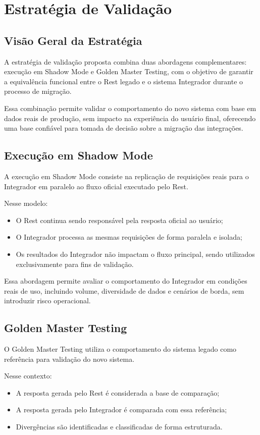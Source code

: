 \section{Estratégia de Validação}

\subsection{Visão Geral da Estratégia}
A estratégia de validação proposta combina duas abordagens complementares: execução em Shadow Mode e Golden Master Testing, com o objetivo de garantir a equivalência funcional entre o Rest legado e o sistema Integrador durante o processo de migração.

Essa combinação permite validar o comportamento do novo sistema com base em dados reais de produção, sem impacto na experiência do usuário final, oferecendo uma base confiável para tomada de decisão sobre a migração das integrações.

\subsection{Execução em Shadow Mode}
A execução em Shadow Mode consiste na replicação de requisições reais para o Integrador em paralelo ao fluxo oficial executado pelo Rest.

Nesse modelo:
\begin{itemize}
    \item O Rest continua sendo responsável pela resposta oficial ao usuário;
    \item O Integrador processa as mesmas requisições de forma paralela e isolada;
    \item Os resultados do Integrador não impactam o fluxo principal, sendo utilizados exclusivamente para fins de validação.
\end{itemize}

Essa abordagem permite avaliar o comportamento do Integrador em condições reais de uso, incluindo volume, diversidade de dados e cenários de borda, sem introduzir risco operacional.

\subsection{Golden Master Testing}

O Golden Master Testing utiliza o comportamento do sistema legado como referência para validação do novo sistema.

Nesse contexto:
\begin{itemize}
    \item A resposta gerada pelo Rest é considerada a base de comparação;
    \item A resposta gerada pelo Integrador é comparada com essa referência;
    \item Divergências são identificadas e classificadas de forma estruturada.
\end{itemize}


